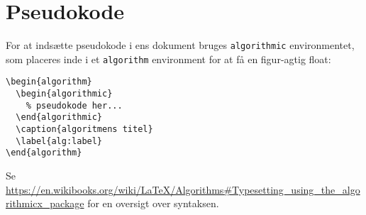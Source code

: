 
\chapter{Pseudokode}
\label{app:pseudocode}

For at indsætte pseudokode i ens dokument bruges \texttt{algorithmic} environmentet, som placeres inde i et \texttt{algorithm} environment for at få en figur-agtig float:
%
\begin{verbatim}
\begin{algorithm}
  \begin{algorithmic}
    % pseudokode her...
  \end{algorithmic}
  \caption{algoritmens titel}
  \label{alg:label}
\end{algorithm}
\end{verbatim}



Se \url{https://en.wikibooks.org/wiki/LaTeX/Algorithms#Typesetting_using_the_algorithmicx_package} for en oversigt over syntaksen.
